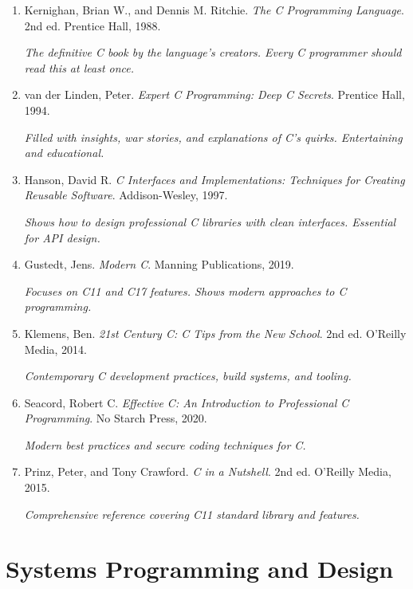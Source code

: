 \documentclass[10pt,openany]{book}
\begin{document}
\begin{enumerate}
    \item Kernighan, Brian W., and Dennis M. Ritchie. \textit{The C Programming Language}. 2nd ed. Prentice Hall, 1988.

    \textit{The definitive C book by the language's creators. Every C programmer should read this at least once.}

    \item van der Linden, Peter. \textit{Expert C Programming: Deep C Secrets}. Prentice Hall, 1994.

    \textit{Filled with insights, war stories, and explanations of C's quirks. Entertaining and educational.}

    \item Hanson, David R. \textit{C Interfaces and Implementations: Techniques for Creating Reusable Software}. Addison-Wesley, 1997.

    \textit{Shows how to design professional C libraries with clean interfaces. Essential for API design.}

    \item Gustedt, Jens. \textit{Modern C}. Manning Publications, 2019.

    \textit{Focuses on C11 and C17 features. Shows modern approaches to C programming.}

    \item Klemens, Ben. \textit{21st Century C: C Tips from the New School}. 2nd ed. O'Reilly Media, 2014.

    \textit{Contemporary C development practices, build systems, and tooling.}

    \item Seacord, Robert C. \textit{Effective C: An Introduction to Professional C Programming}. No Starch Press, 2020.

    \textit{Modern best practices and secure coding techniques for C.}

    \item Prinz, Peter, and Tony Crawford. \textit{C in a Nutshell}. 2nd ed. O'Reilly Media, 2015.

    \textit{Comprehensive reference covering C11 standard library and features.}
\end{enumerate}

\section*{Systems Programming and Design}
\end{document}
